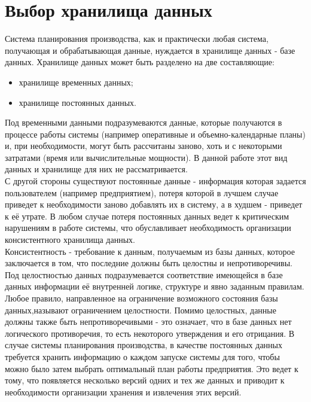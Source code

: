 
\section{Выбор хранилища данных}\label{sec:choose}
\indent Система планирования производства, как и практически любая система, получающая и обрабатывающая данные, нуждается в хранилище данных - базе данных.
Хранилище данных может быть разделено на две составляющие:
\begin{itemize}
	\item хранилище временных данных;
	\item хранилище постоянных данных.
\end{itemize}

\indent Под временными данными подразумеваются данные, которые получаются в процессе работы системы (например оперативные и объемно-календарные планы) и, при необходимости, могут быть рассчитаны заново, хоть и с некоторыми затратами (время или вычислительные мощности).
В данной работе этот вид данных и хранилище для них не рассматривается.\\
\indent С другой стороны существуют постоянные данные - информация которая задается пользователем (например предприятием), потеря которой в лучшем случае приведет к необходимости заново добавлять их в систему, а в худшем - приведет к её утрате.
В любом случае потеря постоянных данных ведет к критическим нарушениям в работе системы, что обуславливает необходимость организации консистентного хранилища данных.\\
\indent Консистентность - требование к данным, получаемым из базы данных, которое заключается в том, что последние должны быть целостны и непротиворечивы.
Под целостностью данных подразумевается соответствие имеющейся в базе данных информации её внутренней логике, структуре и явно заданным правилам.
Любое правило, направленное на ограничение возможного состояния базы данных,называют ограничением целостности.
Помимо целостных, данные должны также быть непротиворечивыми - это означает, что в базе данных нет логического противоречия, то есть некоторого утверждения и его отрицания.
\indent В случае системы планирования производства, в качестве постоянных данных требуется хранить информацию о каждом запуске системы для того, чтобы можно было затем выбрать оптимальный план работы предприятия.
Это ведет к тому, что появляется несколько версий одних и тех же данных и приводит к необходимости организации хранения и извлечения этих версий.



